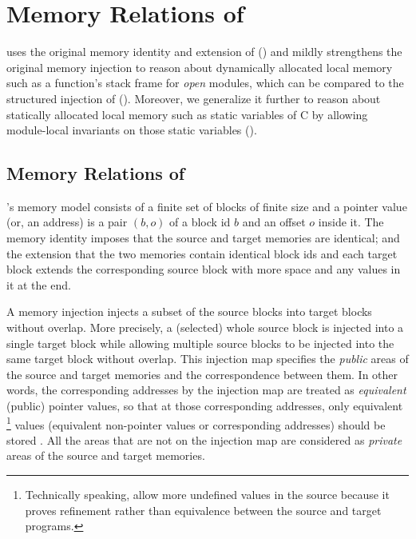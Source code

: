 {\revisioncmd
\section{Memory Relations of \ccm{}}
\label{sec:overview-verification:injection}

\ccm{} uses the original memory identity and extension of \cc{}
() and mildly
strengthens the original memory injection to reason about dynamically allocated
local memory such as a function's stack frame for \emph{open} modules,
which can be compared to the structured injection of \ccc{}
().
Moreover, we generalize it further to reason about statically allocated local memory
such as static variables of C by allowing module-local invariants on those static variables
().


\subsection{Memory Relations of \cc{}}
\label{sec:overview-verification:injection:original}
%
\cc{}'s memory model consists of a finite set of blocks of finite size
and a pointer value (or, an address) is a pair $(b,o)$ of a block id $b$ and an offset $o$ inside it.
The memory identity imposes that the source and target memories are identical;
and the extension that the two memories contain identical block ids and
each target block extends the corresponding source block
with more space and any values in it at the end.

A memory injection injects a subset of the source blocks into target blocks
without overlap. More precisely, a (selected) whole source block is injected into a single target block
while allowing multiple source blocks to be injected into the same target block without overlap.
This injection map specifies the \emph{public} areas of the source and target memories and the correspondence between them.
In other words, the corresponding addresses by the injection map are treated as \emph{equivalent} (public) pointer values,
so that at those corresponding addresses,
only equivalent%
\footnote{Technically speaking, \cc{} allow more undefined values in the source
  because it proves refinement rather than equivalence between the source and target programs.}
values (\ie equivalent non-pointer values or corresponding addresses) should be stored .
All the areas that are not on the injection map are considered as \emph{private} areas of the source and target memories.

}
